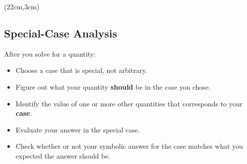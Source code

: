 \documentclass[]{article}
\begin{document}
\begin{textblock*}{5cm}(22cm,3cm)
\centering
{}
\end{textblock*}
\newpage
\begin{TeacherMargin}

\end{TeacherMargin}
\begin{PresentSpace}
\vspace{-10pt}
\section*{Special-Case Analysis}
\vspace{-10pt}
After you solve for a quantity:
\begin{itemize}
	\item Choose a case that is special, not arbitrary.
	\item Figure out what your quantity \textbf{should} be in the case you chose.
	\item Identify the value of one or more other quantities that corresponds to your \textbf{case}.
	\item Evaluate your answer in the special case.
	\item Check whether or not your symbolic answer for the case matches what you expected the answer should be.
\end{itemize}
\end{PresentSpace}
\end{document}
